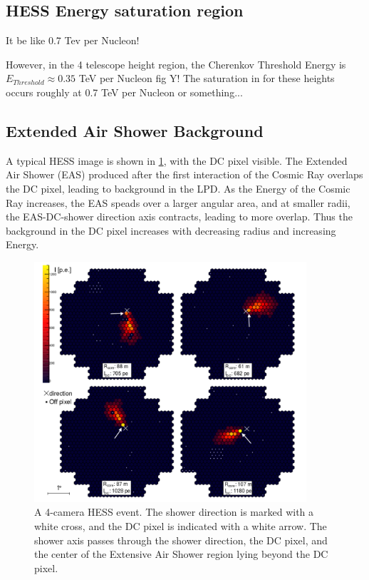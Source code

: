 \documentclass{article}
\begin{document}
\subsection{HESS Energy saturation region}
It be like 0.7 Tev per Nucleon!

However, in the 4 telescope height region, the Cherenkov Threshold Energy is $ E_{Threshold} \approx 0.35$ TeV per Nucleon fig Y! The saturation in for these heights occurs roughly at 0.7 TeV per Nucleon or something...

\subsection{Extended Air Shower Background}
A typical HESS image is shown in \ref{fig:hess}, with the DC pixel visible. The Extended Air Shower (EAS) produced after the first interaction of the Cosmic Ray overlaps the DC pixel, leading to background in the LPD. As the Energy of the Cosmic Ray increases, the EAS speads over a larger angular area, and at smaller radii, the EAS-DC-shower direction axis contracts, leading to more overlap. Thus the background in the DC pixel increases with decreasing radius and increasing Energy. 

\begin{figure}
\begin{center}
\includegraphics[width=0.9\textwidth]{hess}
\caption{A 4-camera HESS event. The shower direction is marked with a white cross, and the DC pixel is indicated with a white arrow. The shower axis passes through the shower direction, the DC pixel, and the center of the Extensive Air Shower region lying beyond the DC pixel.}
\label{fig:hess}
\end{center}
\end{figure}
\end{document}
